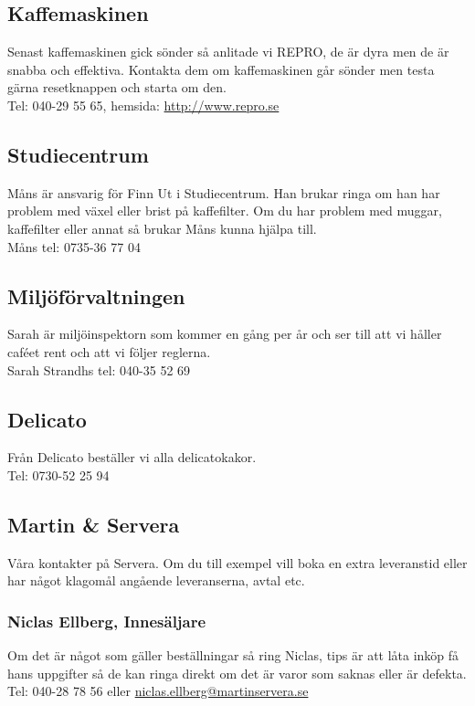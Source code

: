 \documentclass[10pt]{article}
\begin{document}
\subsection*{Kaffemaskinen}
Senast kaffemaskinen gick sönder så anlitade vi REPRO, de är dyra men de är snabba och effektiva. Kontakta dem om kaffemaskinen går sönder men testa gärna resetknappen och starta om den.\\
Tel: 040-29 55 65, hemsida: \url{http://www.repro.se}

\subsection*{Studiecentrum}
Måns är ansvarig för Finn Ut i Studiecentrum. Han brukar ringa om han har problem med växel eller brist på kaffefilter. Om du har problem med muggar, kaffefilter eller annat så brukar Måns kunna hjälpa till.\\
Måns tel: 0735-36 77 04

\subsection*{Miljöförvaltningen}
Sarah är miljöinspektorn som kommer en gång per år och ser till att vi håller caféet rent och att vi följer reglerna.\\
Sarah Strandhs tel: 040-35 52 69

\subsection*{Delicato}
Från Delicato beställer vi alla delicatokakor.\\
Tel: 0730-52 25 94

\subsection*{Martin \& Servera}
Våra kontakter på Servera. Om du till exempel vill boka en extra leveranstid eller har något klagomål angående leveranserna, avtal etc.

\subsubsection*{Niclas Ellberg, Innesäljare}
Om det är något som gäller beställningar så ring Niclas, tips är att låta inköp få hans uppgifter så de kan ringa direkt om det är varor som saknas eller är defekta.\\
Tel: {040-28 78 56} eller \url{niclas.ellberg@martinservera.se}
\end{document}

